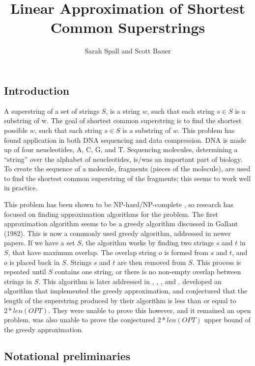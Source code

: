 \documentclass[letterpaper,11pt,titlepage]{article}
\title{Linear Approximation of Shortest Common Superstrings}
\author[1]{Sarah Spall and Scott Bauer}
\begin{document}
\maketitle
\newpage

\subsection*{Introduction}
A superstring of a set of strings $S$, is a string $w$, such that each string $s \in S$ is a substring
of w.  The goal of shortest common superstring is to find the shortest possible $w$, such that each 
string $s \in S$ is a substring of $w$. This problem has found application in both DNA sequencing 
and data compression.  DNA is made up of four neucleotides, A, C, G, and T.  Sequencing molecules,
determining a ``string'' over the alphabet of neucleotides, is/was an important part of biology.  To 
create the sequence of a molecule, fragments (pieces of the molecule), are used to find the shortest
common superstring of the fragments; this seems to work well in practice.  \cite{li1990towards}

 
This problem has been shown to be NP-hard/NP-complete \cite{blum1991linear} \cite{johngallant1980}, 
so research has focused on finding approximation algorithms for the problem.  The first approximation 
algorithm seems to be a greedy algorithm discussed in Gallant (1982). This is now a commonly used greedy 
algorithm, addressed in newer papers.  If we have a set $S$, the algorithm works by finding two strings $s$
and $t$ in $S$, that have maximum overlap.  The overlap string $o$ is formed from $s$ and $t$, and $o$ is
placed back in $S$.  Strings $s$ and $t$ are then removed from $S$.  This process is repeated until
$S$ contains one string, or there is no non-empty overlap between strings in $S$.  This algorithm is later
addressed in \cite{turner1989approximation}, \cite{tarhio1988greedy}, \cite{li1990towards}, and \cite{blum1991linear}.
\cite{tarhio1988greedy} developed an algorithm that implemented the greedy approximation, and conjectured that 
the length of the superstring produced by their algorithm is less than or equal to $2*len(OPT)$.  They were unable
to prove this however, and it remained an open problem.  \cite{turner1989approximation} was also unable to prove
the conjectured $2*len(OPT)$ upper bound of the greedy approximation.  

\subsection*{Notational preliminaries}\\
\end{document}
